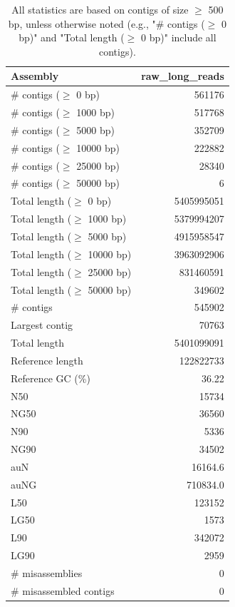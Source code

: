 \documentclass[12pt,a4paper]{article}
\begin{document}
\begin{table}[ht]
\begin{center}
\caption{All statistics are based on contigs of size $\geq$ 500 bp, unless otherwise noted (e.g., "\# contigs ($\geq$ 0 bp)" and "Total length ($\geq$ 0 bp)" include all contigs).}
\begin{tabular}{|l*{1}{|r}|}
\hline
Assembly & raw\_long\_reads \\ \hline
\# contigs ($\geq$ 0 bp) & 561176 \\ \hline
\# contigs ($\geq$ 1000 bp) & 517768 \\ \hline
\# contigs ($\geq$ 5000 bp) & 352709 \\ \hline
\# contigs ($\geq$ 10000 bp) & 222882 \\ \hline
\# contigs ($\geq$ 25000 bp) & 28340 \\ \hline
\# contigs ($\geq$ 50000 bp) & 6 \\ \hline
Total length ($\geq$ 0 bp) & 5405995051 \\ \hline
Total length ($\geq$ 1000 bp) & 5379994207 \\ \hline
Total length ($\geq$ 5000 bp) & 4915958547 \\ \hline
Total length ($\geq$ 10000 bp) & 3963092906 \\ \hline
Total length ($\geq$ 25000 bp) & 831460591 \\ \hline
Total length ($\geq$ 50000 bp) & 349602 \\ \hline
\# contigs & 545902 \\ \hline
Largest contig & 70763 \\ \hline
Total length & 5401099091 \\ \hline
Reference length & 122822733 \\ \hline
Reference GC (\%) & 36.22 \\ \hline
N50 & 15734 \\ \hline
NG50 & 36560 \\ \hline
N90 & 5336 \\ \hline
NG90 & 34502 \\ \hline
auN & 16164.6 \\ \hline
auNG & 710834.0 \\ \hline
L50 & 123152 \\ \hline
LG50 & 1573 \\ \hline
L90 & 342072 \\ \hline
LG90 & 2959 \\ \hline
\# misassemblies & 0 \\ \hline
\# misassembled contigs & 0 \\ \hline

\end{tabular}
\end{center}
\end{table}
\end{document}
